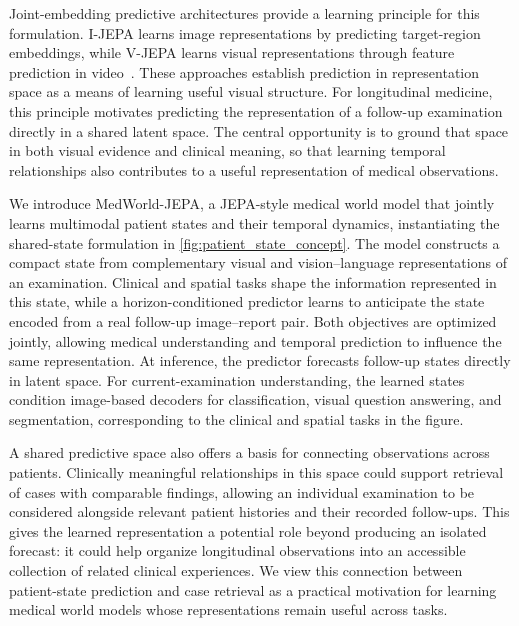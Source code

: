 Joint-embedding predictive architectures provide a learning principle for this formulation. I-JEPA learns image representations by predicting target-region embeddings, while V-JEPA learns visual representations through feature prediction in video~\citep{assran2023ijepa,bardes2024vjepa}. These approaches establish prediction in representation space as a means of learning useful visual structure. For longitudinal medicine, this principle motivates predicting the representation of a follow-up examination directly in a shared latent space. The central opportunity is to ground that space in both visual evidence and clinical meaning, so that learning temporal relationships also contributes to a useful representation of medical observations.

We introduce MedWorld-JEPA, a JEPA-style medical world model that jointly learns multimodal patient states and their temporal dynamics, instantiating the shared-state formulation in \cref{fig:patient_state_concept}. The model constructs a compact state from complementary visual and vision--language representations of an examination. Clinical and spatial tasks shape the information represented in this state, while a horizon-conditioned predictor learns to anticipate the state encoded from a real follow-up image--report pair. Both objectives are optimized jointly, allowing medical understanding and temporal prediction to influence the same representation. At inference, the predictor forecasts follow-up states directly in latent space. For current-examination understanding, the learned states condition image-based decoders for classification, visual question answering, and segmentation, corresponding to the clinical and spatial tasks in the figure.

A shared predictive space also offers a basis for connecting observations across patients. Clinically meaningful relationships in this space could support retrieval of cases with comparable findings, allowing an individual examination to be considered alongside relevant patient histories and their recorded follow-ups. This gives the learned representation a potential role beyond producing an isolated forecast: it could help organize longitudinal observations into an accessible collection of related clinical experiences. We view this connection between patient-state prediction and case retrieval as a practical motivation for learning medical world models whose representations remain useful across tasks.

